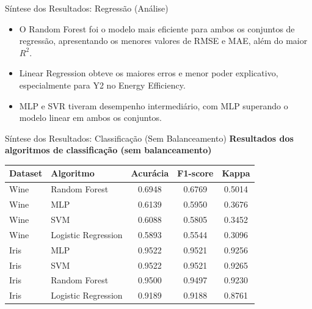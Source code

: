 \documentclass[aspectratio=169]{beamer}
\begin{document}
\begin{frame}{Síntese dos Resultados: Regressão (Análise)}
  \begin{itemize}
    \item O Random Forest foi o modelo mais eficiente para ambos os conjuntos de regressão, apresentando os menores valores de RMSE e MAE, além do maior $R^2$.
    \item Linear Regression obteve os maiores erros e menor poder explicativo, especialmente para Y2 no Energy Efficiency.
    \item MLP e SVR tiveram desempenho intermediário, com MLP superando o modelo linear em ambos os conjuntos.
  \end{itemize}
\end{frame}


\begin{frame}{Síntese dos Resultados: Classificação (Sem Balanceamento)}
  \centering
  \scriptsize
  \textbf{Resultados dos algoritmos de classificação (sem balanceamento)}
  \vspace{0.5em}

  \begin{tabular}{llccc}
    \toprule
    \textbf{Dataset} & \textbf{Algoritmo} & \textbf{Acurácia} & \textbf{F1-score} & \textbf{Kappa} \\
    \midrule
    Wine & Random Forest & 0.6948 & 0.6769 & 0.5014 \\
    Wine & MLP & 0.6139 & 0.5950 & 0.3676 \\
    Wine & SVM & 0.6088 & 0.5805 & 0.3452 \\
    Wine & Logistic Regression & 0.5893 & 0.5544 & 0.3096 \\
    Iris & MLP & 0.9522 & 0.9521 & 0.9256 \\
    Iris & SVM & 0.9522 & 0.9521 & 0.9265 \\
    Iris & Random Forest & 0.9500 & 0.9497 & 0.9230 \\
    Iris & Logistic Regression & 0.9189 & 0.9188 & 0.8761 \\
    \bottomrule
  \end{tabular}
\end{frame}
\end{document}
